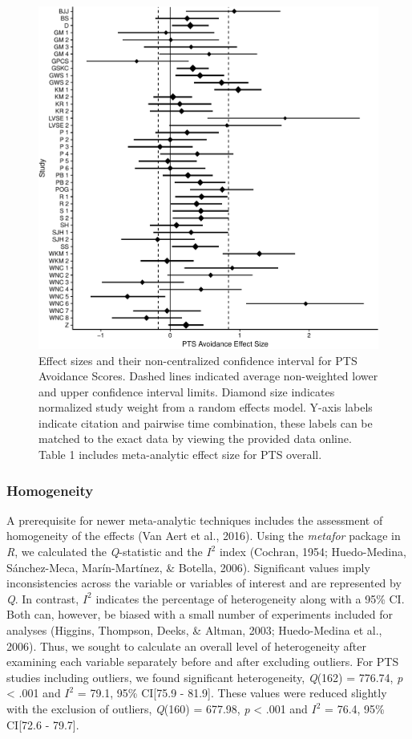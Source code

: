 \documentclass[man, mask]{apa6}
\theoremstyle{definition}
\theoremstyle{definition}
\theoremstyle{definition}
\theoremstyle{remark}
\begin{document}
\begin{figure}[htbp]
\centering
\includegraphics{meta_markdown_files/figure-latex/ptspicavoid-1.pdf}
\caption{\label{fig:ptspicavoid}Effect sizes and their non-centralized
confidence interval for PTS Avoidance Scores. Dashed lines indicated
average non-weighted lower and upper confidence interval limits. Diamond
size indicates normalized study weight from a random effects model.
Y-axis labels indicate citation and pairwise time combination, these
labels can be matched to the exact data by viewing the provided data
online. Table 1 includes meta-analytic effect size for PTS overall.}
\end{figure}

\subsubsection{Homogeneity}\label{homogeneity}

A prerequisite for newer meta-analytic techniques includes the
assessment of homogeneity of the effects (Van Aert et al., 2016). Using
the \emph{metafor} package in \emph{R}, we calculated the
\emph{Q}-statistic and the \(I^2\) index (Cochran, 1954; Huedo-Medina,
Sánchez-Meca, Marín-Martínez, \& Botella, 2006). Significant values
imply inconsistencies across the variable or variables of interest and
are represented by \emph{Q}. In contrast, \(I^2\) indicates the
percentage of heterogeneity along with a 95\% CI. Both can, however, be
biased with a small number of experiments included for analyses
(Higgins, Thompson, Deeks, \& Altman, 2003; Huedo-Medina et al., 2006).
Thus, we sought to calculate an overall level of heterogeneity after
examining each variable separately before and after excluding outliers.
For PTS studies including outliers, we found significant heterogeneity,
\emph{Q}(162) = 776.74, \emph{p} \textless{} .001 and \(I^2\) = 79.1,
95\% CI{[}75.9 - 81.9{]}. These values were reduced slightly with the
exclusion of outliers, \emph{Q}(160) = 677.98, \emph{p} \textless{} .001
and \(I^2\) = 76.4, 95\% CI{[}72.6 - 79.7{]}.
\end{document}
